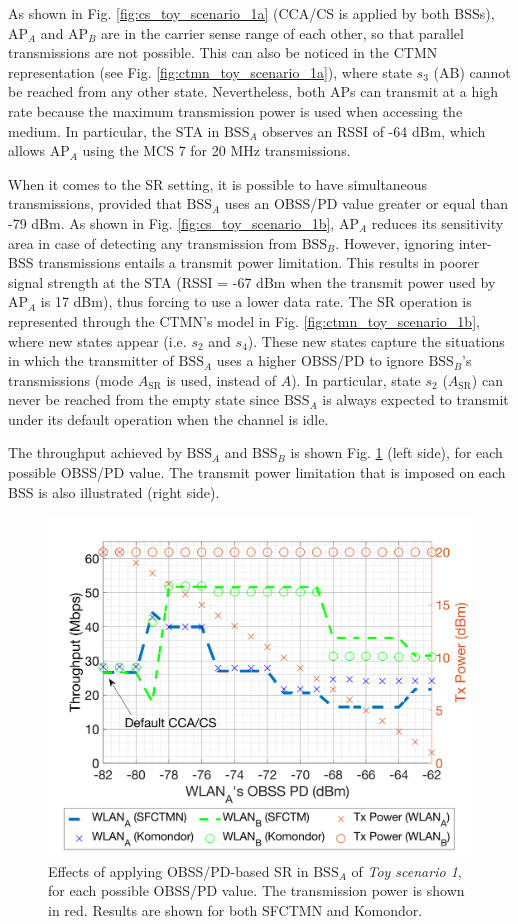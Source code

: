 \documentclass{article}
\begin{document}
As shown in Fig. \ref{fig:cs_toy_scenario_1a} (CCA/CS is applied by both BSSs), $\text{AP}_A$ and $\text{AP}_B$ are in the carrier sense range of each other, so that parallel transmissions are not possible. This can also be noticed in the CTMN representation (see Fig. \ref{fig:ctmn_toy_scenario_1a}), where state $s_3$ (AB) cannot be reached from any other state. Nevertheless, both APs can transmit at a high rate because the maximum transmission power is used when accessing the medium. In particular, the STA in $\text{BSS}_A$ observes an RSSI of -64 dBm, which allows $\text{AP}_A$ using the MCS 7 for 20 MHz transmissions.

When it comes to the SR setting, it is possible to have simultaneous transmissions, provided that $\text{BSS}_A$ uses an OBSS/PD value greater or equal than -79 dBm. As shown in Fig. \ref{fig:cs_toy_scenario_1b}, $\text{AP}_A$ reduces its sensitivity area in case of detecting any transmission from $\text{BSS}_B$. However, ignoring inter-BSS transmissions entails a transmit power limitation. This results in poorer signal strength at the STA (RSSI = -67 dBm when the transmit power used by AP$_A$ is 17 dBm), thus forcing to use a lower data rate. The SR operation is represented through the CTMN's model in Fig. \ref{fig:ctmn_toy_scenario_1b}, where new states appear (i.e. $s_2$ and $s_4$). These new states capture the situations in which the transmitter of $\text{BSS}_A$ uses a higher OBSS/PD to ignore $\text{BSS}_B$'s transmissions (mode $A_\text{SR}$ is used, instead of $A$). In particular, state $s_2$ ($A_\text{SR}$) can never be reached from the empty state since $\text{BSS}_A$ is always expected to transmit under its default operation when the channel is idle.

The throughput achieved by $\text{BSS}_A$ and $\text{BSS}_B$ is shown Fig. \ref{fig:toy_scenario_1_results} (left side), for each possible OBSS/PD value. The transmit power limitation that is imposed on each BSS is also illustrated (right side).  
\begin{figure}[ht!]
	\centering
	\includegraphics[width=0.6\columnwidth]{SIM_1_1}
	\caption{Effects of applying OBSS/PD-based SR in $\text{BSS}_A$ of \emph{Toy scenario 1}, for each possible OBSS/PD value. The transmission power is shown in red. Results are shown for both SFCTMN and Komondor.}		\label{fig:toy_scenario_1_results}
\end{figure}
\end{document}
